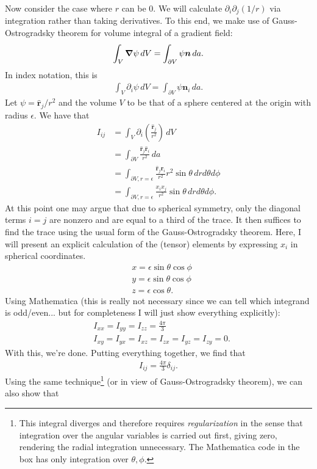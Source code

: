 \documentclass{article}
\theoremstyle{definition}
\newcommand{\p}{\partial}
\newcommand{\f}[2]{\frac{#1}{#2}}
\newcommand{\lp}{\left(}
\newcommand{\rp}{\right)}
\begin{document}
\begin{enumerate}[label=(\alph*)]
	
	Now consider the case where $r$ can be $0$. We will calculate $\p_i \p_j (1/r)$ via integration rather than taking derivatives. To this end, we make use of Gauss-Ostrogradsky theorem for volume integral of a gradient field:
	\begin{align*}
	\int_V \grad \psi \,dV = \int_{\p V} \psi \bm{n} \,da.
	\end{align*}
	In index notation, this is 
	\begin{align*}
	\int_V \p_i \psi \,dV = \int_{\p V} \psi \bm{n}_i \,da.
	\end{align*}
	Let $\psi = \hat{\bm{r}}_j / r^2$ and the volume $V$ to be that of a sphere centered at the origin with radius $\epsilon$. We have that
	\begin{align*}
	I_{ij} &= \int_V  \p_i \lp \f{\hat{\bm{r}}_j}{r^2}\rp \,dV \\
	&= \int_{\p V} \f{\hat{\bm{r}}_j \hat{\bm{r}}_i }{r^2} \,da \\
	&= \int_{\p V, r=\epsilon} \f{\hat{\bm{r}}_j  \hat{\bm{r}}_i }{r^2}r^2\sin\theta\,dr d\theta d\phi\\
	&= \int_{\p V, r=\epsilon} \f{x_i x_j}{r^2}\sin\theta\,dr d\theta d\phi.
	\end{align*}
	At this point one may argue that due to spherical symmetry, only the diagonal terms $i=j$ are nonzero and are equal to a third of the trace. It then suffices to find the trace using the usual form of the Gauss-Ostrogradsky theorem. Here, I will present an explicit calculation of the (tensor) elements by expressing $x_i$ in spherical coordinates. 
	\begin{align*}
	&x = \epsilon\sin\theta\cos\phi \\
	&y = \epsilon\sin\theta\cos\phi\\
	&z = \epsilon\cos\theta.
	\end{align*}
	Using Mathematica (this is really not necessary since we can tell which integrand is odd/even... but for completeness I will just show everything explicitly):
	\begin{align*}
	&I_{xx} = I_{yy} = I_{zz} = \f{4\pi}{3} \\
	&I_{xy} = I_{yx} = I_{xz} = I_{zx} = I_{yz} = I_{zy} = 0.
	\end{align*}
	With this, we're done. Putting everything together, we find that
	\begin{align*}
	I_{ij} = \f{4\pi}{3}\delta_{ij}.
	\end{align*}
	Using the same technique\footnote{This integral diverges and therefore requires \textit{regularization} in the sense that integration over the angular variables is carried out first, giving zero, rendering the radial integration unnecessary. The Mathematica code in the box has only integration over $\theta,\phi$.} (or in view of Gauss-Ostrogradsky theorem), we can also show that 

\end{enumerate}
\end{document}

